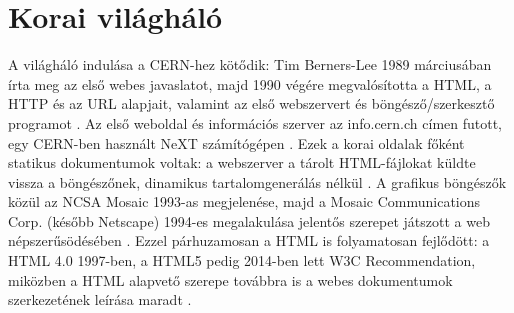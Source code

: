 \section{Korai világháló}
A világháló indulása a CERN-hez kötődik: Tim Berners-Lee 1989 márciusában írta meg az első webes javaslatot, majd 1990 végére megvalósította a HTML, a HTTP és az URL alapjait, valamint az első webszervert és böngésző/szerkesztő programot \cite{cern2024www35,w3cLittleWebHistory}. Az első weboldal és információs szerver az info.cern.ch címen futott, egy CERN-ben használt NeXT számítógépen \cite{w3cLittleWebHistory}. Ezek a korai oldalak főként statikus dokumentumok voltak: a webszerver a tárolt HTML-fájlokat küldte vissza a böngészőnek, dinamikus tartalomgenerálás nélkül \cite{mdnWebServer}. A grafikus böngészők közül az NCSA Mosaic 1993-as megjelenése, majd a Mosaic Communications Corp. (később Netscape) 1994-es megalakulása jelentős szerepet játszott a web népszerűsödésében \cite{w3cLittleWebHistory,nsf2004mosaic}. Ezzel párhuzamosan a HTML is folyamatosan fejlődött: a HTML 4.0 1997-ben, a HTML5 pedig 2014-ben lett W3C Recommendation, miközben a HTML alapvető szerepe továbbra is a webes dokumentumok szerkezetének leírása maradt \cite{w3c1997html40,w3c2014html5}.
